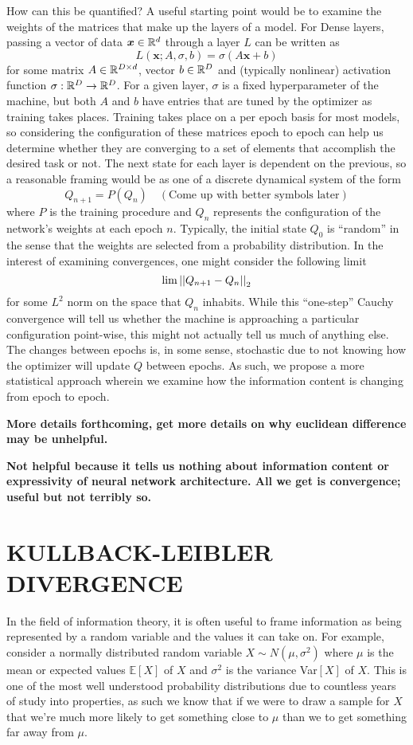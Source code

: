 How can this be quantified? A useful starting point would be to examine the weights of
the matrices that make up the layers of a model. For Dense layers, passing a vector of 
data $\boldsymbol{x} \in \mathbb{R}^{d}$ through a layer $L$ can be written as 
$$L(\boldsymbol{x}; A, \sigma, b) = \sigma(A\boldsymbol{x} + b)$$
for some matrix $A \in \mathbb{R}^{D\times d}$, vector $b \in \mathbb{R}^{D}$ and (typically nonlinear)
activation function $\sigma: \mathbb{R}^D \to \mathbb{R}^D$. For a given layer, $\sigma$ is a fixed 
hyperparameter of the machine, but both $A$ and $b$ have entries that are tuned by the 
optimizer as training takes places. Training takes place on a per epoch basis for most 
models, so considering the configuration of these matrices epoch to epoch can help us 
determine whether they are converging to a set of elements that accomplish the desired 
task or not. The next state for each layer is dependent on the previous, so a reasonable 
framing would be as one of a discrete dynamical system of the form
$$Q_{n+1} = P(Q_n) \quad (\text{Come up with better symbols later})$$
where $P$ is the training procedure and $Q_n$ represents the configuration of the network's
weights at each epoch $n$. Typically, the initial state $Q_0$ is ``random'' in the sense 
that the weights are selected from a probability distribution. In the interest of examining 
convergences, one might consider the following limit 
$$\lim \left|\left|Q_{n+1} - Q_n\right|\right|_2$$
for some $L^2$ norm on the space that $Q_n$ inhabits. While this ``one-step'' Cauchy 
convergence will tell us whether the machine is approaching a particular configuration
point-wise, this might not actually tell us much of anything else. The changes between 
epochs is, in some sense, stochastic due to not knowing how the optimizer will update $Q$
between epochs. As such, we propose a more statistical approach wherein we examine how the
information content is changing from epoch to epoch. 

\textbf{More details forthcoming, get more details on why euclidean difference may be 
unhelpful.}

\textbf{Not helpful because it tells us nothing about information content or expressivity of 
neural network architecture. All we get is convergence; useful but not terribly so.}

\chapter{KULLBACK-LEIBLER DIVERGENCE}
In the field of information theory, it is often useful to frame information as being 
represented by a random variable and the values it can take on. For example, consider 
a normally distributed random variable $X \sim N(\mu, \sigma^2)$ where $\mu$ is the 
mean or expected values $\mathbb{E}[X]$ of $X$ and $\sigma^2$ is the variance 
Var$[X]$ of $X$. This is one of the most well understood probability distributions
due to countless years of study into properties, as such we know that if we were to 
draw a sample for $X$ that we're much more likely to get something close to $\mu$
than we to get something far away from $\mu$.

